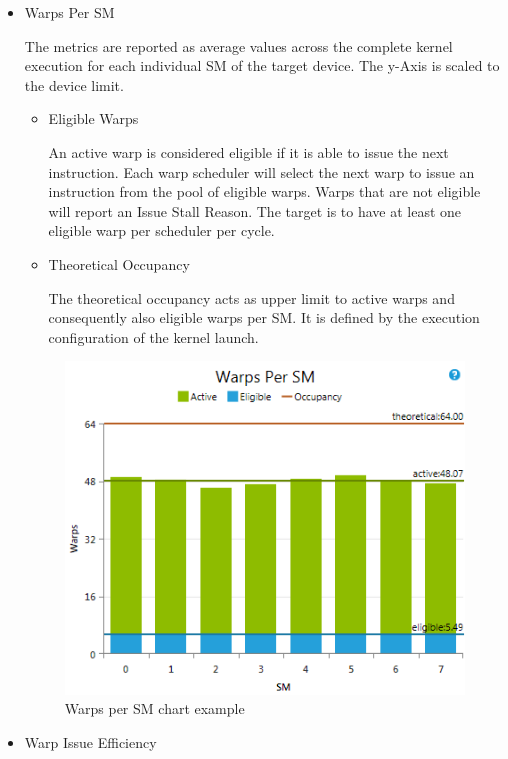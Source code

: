 \documentclass[oneside,openright,12pt,final,en]{mgr}
\begin{document}
\begin{itemize}
	\item Warps Per SM
	
	The metrics are reported as average values across the complete kernel execution for each individual SM of the target device. The y-Axis is scaled to the device limit.
	
	
	\begin{itemize}
	
		
		\item Eligible Warps 
		
		An active warp is considered eligible if it is able to issue the next instruction. Each warp scheduler will select the next warp to issue an instruction from the pool of eligible warps. Warps that are not eligible will report an Issue Stall Reason. The target is to have at least one eligible warp per scheduler per cycle.
		
		\item Theoretical Occupancy
		
		The theoretical occupancy acts as upper limit to active warps and consequently also eligible warps per SM. It is defined by the execution configuration of the kernel launch.
		
	\end{itemize}
	
	\begin{figure}[H]
		\centering
		\includegraphics{IssueEfficiencyChartWarpsPerSm}
		\caption{Warps per SM chart example}
	\end{figure}

	\item Warp Issue Efficiency
	

\end{itemize}
\end{document}
